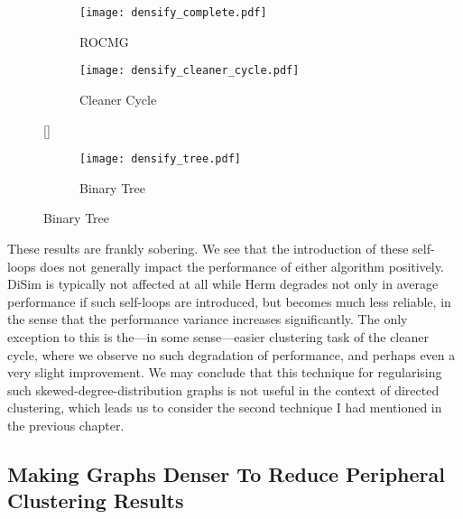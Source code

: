 \setcounter{figure}{9}

\begin{figure}[t!]
\begin{subfigure}[t]{0.45\textwidth}
\begin{center}
\texttt{[image: densify\_complete.pdf]}
\end{center}
\caption{ROCMG}
\end{subfigure}
\begin{subfigure}[t]{0.45\textwidth}
\begin{center}
\texttt{[image: densify\_cleaner\_cycle.pdf]}
\end{center}
\caption{Cleaner Cycle}
\end{subfigure}
[\FBwidth]
{\caption{Impact of superpositioning the input graph with a randomly oriented complete one, for the noted meta-graphs.}\label{fig:densify}}{
\begin{subfigure}[t]{0.45\textwidth}
\begin{center}
\texttt{[image: densify\_tree.pdf]}
\end{center}
\caption{Binary Tree}
\end{subfigure}

}
\end{figure}

These results are frankly sobering. We see that the introduction of these self-loops does not 
generally impact the performance of either algorithm positively. DiSim is typically not affected 
at all while Herm degrades not only in average performance if such self-loops are introduced, but 
becomes much less reliable, in the sense that the performance variance increases significantly. 
The only exception to this is the---in some sense---easier clustering task of the cleaner cycle, 
where we observe no such degradation of performance, and perhaps even a very slight improvement. 
We may conclude that this technique for regularising such skewed-degree-distribution graphs is not 
useful in the context of directed clustering, which leads us to consider the second technique I 
had mentioned in the previous chapter.

\subsection{Making Graphs Denser To Reduce Peripheral Clustering Results}

